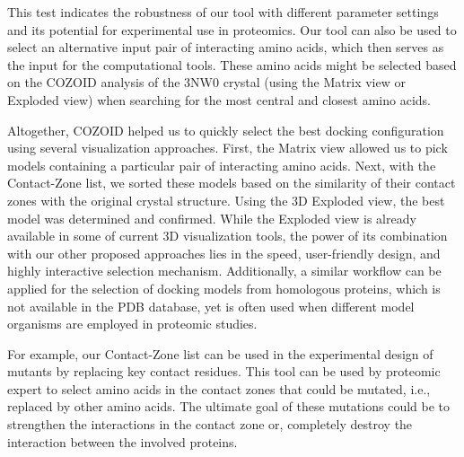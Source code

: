 \documentclass{bmcart}
\def\ExpView {Exploded view\xspace}
\def\MatView {Matrix view\xspace}
\def\CoZoList{Contact-Zone list\xspace}
\begin{document}
This test indicates the robustness of our tool with different parameter settings and its potential for experimental use in proteomics.
Our tool can also be used to select an alternative input pair of interacting amino acids, which then serves as the input for the computational tools.
These amino acids might be selected based on the COZOID analysis of the 3NW0 crystal (using the \MatView or \ExpView) when searching for the most central and closest amino acids.

Altogether, COZOID helped us to quickly select the best docking configuration using several visualization approaches. 
First, the \MatView allowed us to pick models containing a particular pair of interacting amino acids. 
Next, with the \CoZoList, we sorted these models based on the similarity of their contact zones with the original crystal structure. 
Using the 3D \ExpView, the best model was determined and confirmed. 
While the Exploded view is already available in some of current 3D visualization tools, the power of its combination with our other proposed approaches lies in the speed, user-friendly design, and highly interactive selection mechanism. 
Additionally, a similar workflow can be applied for the selection of docking models from homologous proteins, which is not available in the PDB database, yet is often used when different model organisms are employed in proteomic studies.
 
For example, our \CoZoList can be used in the experimental design of mutants by replacing key contact residues. 
This tool can be used by proteomic expert to select amino acids in the contact zones that could be mutated, i.e., replaced by other amino acids.
The ultimate goal of these mutations could be to strengthen the interactions in the contact zone or, completely destroy the interaction between the involved proteins. 
\end{document}
